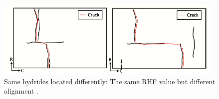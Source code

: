 \vspace{50 mm}

\begin{figure}[h] %
    \centering
    \includegraphics[width=4.3in]{Figures/1-Introduction/same RHF.png}
    \caption{Same hydrides located differently: The same RHF value but different alignment \cite{SIMON2021152817}.}
    \label{fig:RHF_comparison}
\end{figure}
